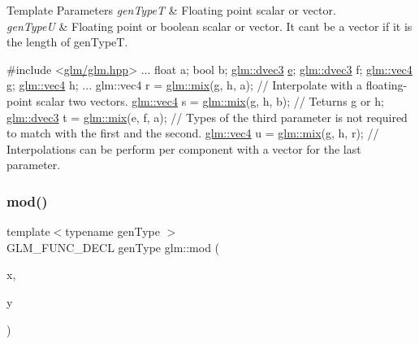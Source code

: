 \begin{DoxyTemplParams}{Template Parameters}
{\em gen\+TypeT} & Floating point scalar or vector. \\
\hline
{\em gen\+TypeU} & Floating point or boolean scalar or vector. It can\textquotesingle{}t be a vector if it is the length of gen\+TypeT.\\
\hline
\end{DoxyTemplParams}

\begin{DoxyCode}
\textcolor{preprocessor}{#include <\hyperlink{glm_8hpp}{glm/glm.hpp}>}
...
float a;
\textcolor{keywordtype}{bool} b;
\hyperlink{structglm_1_1tvec3}{glm::dvec3} \hyperlink{group__gtc__constants_ga4b7956eb6e2fbedfc7cf2e46e85c5139}{e};
\hyperlink{structglm_1_1tvec3}{glm::dvec3} f;
\hyperlink{structglm_1_1tvec4}{glm::vec4} g;
\hyperlink{structglm_1_1tvec4}{glm::vec4} h;
...
glm::vec4 r = \hyperlink{group__core__func__common_gadccbaffe46f369cf1a96b2aef92cbfdd}{glm::mix}(g, h, a); \textcolor{comment}{// Interpolate with a floating-point scalar two vectors. }
\hyperlink{structglm_1_1tvec4}{glm::vec4} s = \hyperlink{group__core__func__common_gadccbaffe46f369cf1a96b2aef92cbfdd}{glm::mix}(g, h, b); \textcolor{comment}{// Teturns g or h;}
\hyperlink{structglm_1_1tvec3}{glm::dvec3} t = \hyperlink{group__core__func__common_gadccbaffe46f369cf1a96b2aef92cbfdd}{glm::mix}(e, f, a); \textcolor{comment}{// Types of the third parameter is not required to
       match with the first and the second.}
\hyperlink{structglm_1_1tvec4}{glm::vec4} u = \hyperlink{group__core__func__common_gadccbaffe46f369cf1a96b2aef92cbfdd}{glm::mix}(g, h, r); \textcolor{comment}{// Interpolations can be perform per component with a
       vector for the last parameter.}
\end{DoxyCode}
 \mbox{\label{group__core__func__common_ga12201563ef902e3b07e0d1d7656efdb1}} 
\subsubsection{\texorpdfstring{mod()}{mod()}}
{\footnotesize\ttfamily template$<$typename gen\+Type $>$ \\
G\+L\+M\+\_\+\+F\+U\+N\+C\+\_\+\+D\+E\+CL gen\+Type glm\+::mod (\begin{DoxyParamCaption}\item[{gen\+Type}]{x,  }\item[{gen\+Type}]{y }\end{DoxyParamCaption})}

